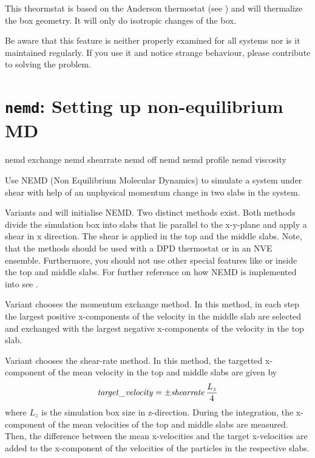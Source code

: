This theormstat is based on the Anderson thermostat (see
\cite{andersen80a, mann05d}) and will thermalize the box geometry. It
will only do isotropic changes of the box.

Be aware that this feature is neither properly examined for all
systems nor is it maintained regularly. If you use it and notice
strange behaviour, please contribute to solving the problem.

\section{\texttt{nemd}: Setting up non-equilibrium MD}
\label{sec:NEMD}

\begin{essyntax}
  nemd exchange  
  nemd shearrate  
  nemd off
  nemd
  nemd profile
  nemd viscosity
  \begin{features}
  \end{features}
\end{essyntax}

Use NEMD (Non Equilibrium Molecular Dynamics) to simulate a system
under shear with help of an unphysical momentum change in two slabs in
the system.

Variants  and  will initialise NEMD. Two
distinct methods exist.  Both methods divide the simulation box into
 slabs that lie parallel to the x-y-plane and apply a
shear in x direction.  The shear is applied in the top and the middle
slabs. Note, that the methods should be used with a DPD thermostat or
in an NVE ensemble.  Furthermore, you should not use other special
features like  or  inside the
top and middle slabs. For further reference on how NEMD is implemented
into \es see \cite{soddeman01a}.


Variant  chooses the momentum exchange method.  In this
method, in each step the  largest positive
x-components of the velocity in the middle slab are selected and
exchanged with the  largest negative x-components of
the velocity in the top slab. 

Variant  chooses the shear-rate method. In this method, the
targetted x-component of the mean velocity in the top and middle slabs
are given by 
\begin{equation}
  \mathrm{\mathit{target\_velocity}} = \pm \mathrm{\mathit{shearrate}}\,\frac{L_z}{4}
\end{equation}
where $L_z$ is the simulation box size in z-direction. During the
integration, the x-component of the mean velocities of the top and
middle slabs are measured.  Then, the difference between the mean
x-velocities and the target x-velocities are added to the x-component
of the velocities of the particles in the respective slabs. 

